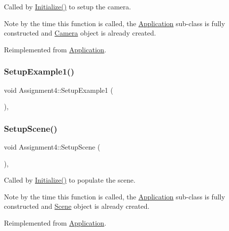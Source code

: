 Called by \hyperlink{class_application_a17cf1ea4552d26a1c20f7d98d793d41d}{Initialize()} to setup the camera.

Note by the time this function is called, the \hyperlink{class_application}{Application} sub-\/class is fully constructed and \hyperlink{class_camera}{Camera} object is already created.

Reimplemented from \hyperlink{class_application_a2eb61ca027f223a5c5ad1bf982481193}{Application}.

\hypertarget{class_assignment4_a019c1cc10bd21a91a88e68e11f86b846}{}\label{class_assignment4_a019c1cc10bd21a91a88e68e11f86b846}
\subsubsection{\texorpdfstring{Setup\+Example1()}{SetupExample1()}}
{\footnotesize\ttfamily void Assignment4\+::\+Setup\+Example1 (\begin{DoxyParamCaption}{ }\end{DoxyParamCaption})\hspace{0.3cm}{\ttfamily [private]}, {\ttfamily [virtual]}}

\hypertarget{class_assignment4_a38c50647bb65ff03aaf293fcc21dc5fd}{}\label{class_assignment4_a38c50647bb65ff03aaf293fcc21dc5fd}
\subsubsection{\texorpdfstring{Setup\+Scene()}{SetupScene()}}
{\footnotesize\ttfamily void Assignment4\+::\+Setup\+Scene (\begin{DoxyParamCaption}{ }\end{DoxyParamCaption})\hspace{0.3cm}{\ttfamily [private]}, {\ttfamily [virtual]}}



Called by \hyperlink{class_application_a17cf1ea4552d26a1c20f7d98d793d41d}{Initialize()} to populate the scene.

Note by the time this function is called, the \hyperlink{class_application}{Application} sub-\/class is fully constructed and \hyperlink{class_scene}{Scene} object is already created.

Reimplemented from \hyperlink{class_application_aa8e8017ef8dd86293c96d0645e66d440}{Application}.

